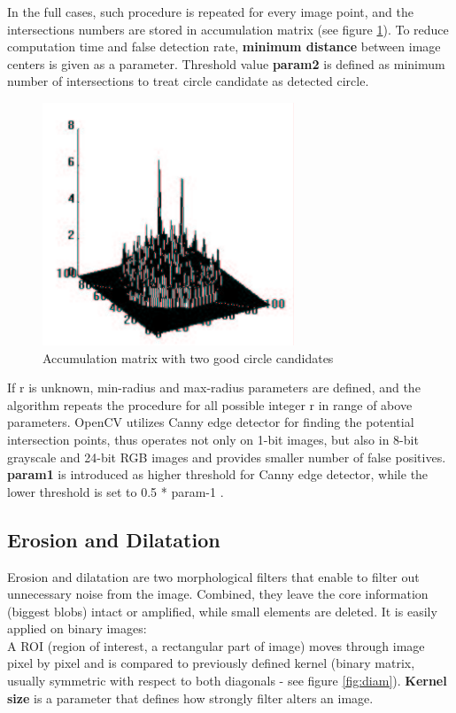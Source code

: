 \documentclass[12pt,twoside,a4paper]{article}
\begin{document}
In the full cases, such procedure is repeated for every image point, and the intersections numbers are stored in accumulation matrix (see figure \ref{fig:accu}).\cite{hgt}
To reduce computation time and false detection rate, \textbf{minimum distance} between image centers is given as a parameter.
Threshold value \textbf{param2} is defined as minimum number of intersections to treat circle candidate as detected circle.
 
\begin{figure}[H]
\centering
\includegraphics[width=0.3\paperwidth]{accu}
\caption{Accumulation matrix with two good circle candidates\cite{hgt}}\label{fig:accu}
\end{figure}

If r is unknown, min-radius and max-radius parameters are defined, and the algorithm repeats the procedure for all possible integer r in range of above parameters.
OpenCV utilizes Canny edge detector for finding the potential intersection points, thus operates not only on 1-bit images, but also in 8-bit grayscale and 24-bit RGB images and provides smaller number of false positives.\cite{mastercv}
\textbf{param1} is introduced as higher threshold for Canny edge detector, while the lower threshold is set to 0.5 * param-1\cite{fd} .


\subsection{Erosion and Dilatation}
Erosion and dilatation are two morphological filters that enable to filter out unnecessary noise from the image.
Combined, they leave the core information (biggest blobs) intact or amplified, while small elements are deleted.
It is easily applied on binary images:\\
A ROI (region of interest, a rectangular part of image) moves through image pixel by pixel and is compared to previously defined kernel (binary matrix, usually symmetric with respect to both diagonals - see figure \ref{fig:diam}). \textbf{Kernel size} is a parameter that defines how strongly filter alters an image.
\end{document}
